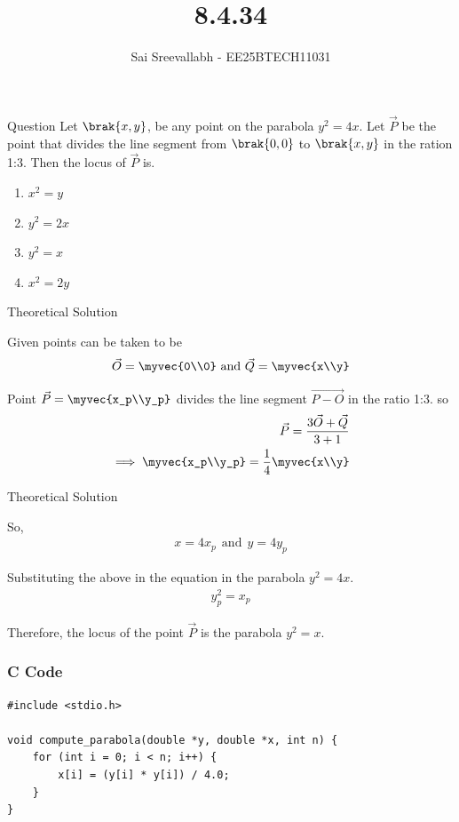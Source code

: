 \documentclass{beamer}
\title{8.4.34}
\author{Sai Sreevallabh - EE25BTECH11031}
\begin{document}
\frame{\titlepage}

\begin{frame}{Question}
Let $\brak{x,y}$, be any point on the parabola $y^2 = 4x$. Let $\vec{P}$ be the point that divides the line segment from $\brak{0,0}$ to $\brak{x,y}$ in the ration 1:3. Then the locus of $\vec{P}$ is.
\begin{enumerate}
    \item $x^2 = y$
    \item $y^2 = 2x$
    \item $y^2 = x$
    \item $x^2 = 2y$
\end{enumerate}

\end{frame}

\begin{frame}{Theoretical Solution}

Given points can be taken to be
\begin{align}
    \vec{O} = \myvec{0\\0} \ \text{and} \ \vec{Q} = \myvec{x\\y}
\end{align}

Point $\vec{P} = \myvec{x_p\\y_p}$ divides the line segment $\vec{P-O}$ in the ratio 1:3. so
\begin{align}
    \vec{P} = \frac{3\vec{O}+\vec{Q}}{3+1}\\
    \implies \myvec{x_p\\y_p} = \frac{1}{4}\myvec{x\\y}
\end{align}

\end{frame}

\begin{frame}{Theoretical Solution}

So, 
\begin{align}
    x = 4x_p \ \ \text{and} \ \ y = 4y_p
\end{align}

Substituting the above in the equation in the parabola $y^2 = 4x$.
\begin{align}
    y_p^2 = x_p
\end{align}

Therefore, the locus of the point $\vec{P}$ is the parabola $y^2 = x$. 

\end{frame}

\begin{frame}[fragile]
    \frametitle{C Code}

    \begin{lstlisting}
#include <stdio.h>

void compute_parabola(double *y, double *x, int n) {
    for (int i = 0; i < n; i++) {
        x[i] = (y[i] * y[i]) / 4.0;
    }
}

    \end{lstlisting}

\end{frame}
\end{document}
